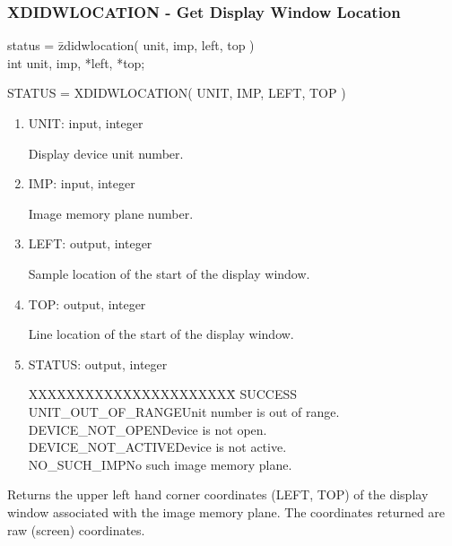 \subsubsection{XDIDWLOCATION - Get Display Window Location}
\begin{tabbing}
status = \=zdidwlocation( unit, imp, left, top )\\
\>int  unit, imp, *left, *top;\\
\end{tabbing}
STATUS = XDIDWLOCATION( UNIT, IMP, LEFT, TOP )
\begin{enumerate}
\item UNIT:  input, integer

Display device unit number.
\item IMP:  input, integer

Image memory plane number.
\item LEFT:  output, integer

Sample location of the start of the display window.
\item TOP:  output, integer

Line location of the start of the display window.
\item STATUS:  output, integer
\begin{tabbing}
XXXXXXXXXXXXXXXXXXXXXX\=\kill
SUCCESS\\
UNIT\_OUT\_OF\_RANGE\>Unit number is out of range.\\
DEVICE\_NOT\_OPEN\>Device is not open.\\
DEVICE\_NOT\_ACTIVE\>Device is not active.\\
NO\_SUCH\_IMP\>No such image memory plane.\\
\end{tabbing}
\end{enumerate}
Returns the upper left hand corner coordinates (LEFT, TOP) of the
display window associated with the image memory plane.  The
coordinates returned are raw (screen) coordinates.
\newpage
